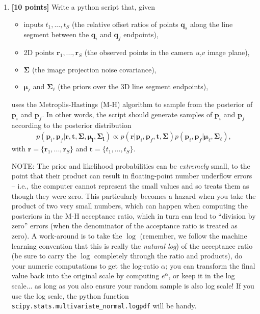 \documentclass[10pt]{article}
\begin{document}
\begin{enumerate}

\item {\bf [10 points]} Write a python script that, given
\begin{itemize}
\item inputs $t_1, ..., t_S$ (the relative offset ratios of points $\mathbf{q}_s$ along the line segment between the $\mathbf{q}_i$ and $\mathbf{q}_f$ endpoints),
\item 2D points $\mathbf{r}_1, ..., \mathbf{r}_S$ (the observed points in the camera $u$,$v$ image plane),
\item $\boldsymbol{\Sigma}$ (the image projection noise covariance),
\item $\boldsymbol{\mu}_{\boldsymbol{\ell}}$ and $\boldsymbol{\Sigma}_{\boldsymbol{\ell}}$ (the priors over the 3D line segment endpoints),
\end{itemize}
uses the Metroplis-Hastings (M-H) algorithm to sample from the posterior of $\mathbf{p}_i$ and $\mathbf{p}_f$.  In other words, the script should generate samples of $\mathbf{p}_i$ and $\mathbf{p}_f$ according to the posterior distribution
\begin{eqnarray*}
p(\mathbf{p}_i, \mathbf{p}_f | \mathbf{r}, \mathbf{t}, \boldsymbol{\Sigma}, \boldsymbol{\mu}_\mathbf{l}, \boldsymbol{\Sigma}_\mathbf{l}) 
\propto 
p(\mathbf{r} | \mathbf{p}_i, \mathbf{p}_f, \mathbf{t}, \boldsymbol{\Sigma})
p(\mathbf{p}_i, \mathbf{p}_f | \boldsymbol{\mu}_\mathbf{\ell}, \boldsymbol{\Sigma}_\mathbf{\ell}),
\end{eqnarray*}
with $\mathbf{r} = \{\mathbf{r}_1, ..., \mathbf{r}_S \}$ and $\mathbf{t} = \{t_1, ..., t_S \}$.

NOTE: The prior and likelihood probabilities can be {\em extremely} small, to the point that their product can result in floating-point number underflow errors -- i.e., the computer cannot represent the small values and so treats them as though they were zero. This particularly becomes a hazard when you take the product of two very small numbers, which can happen when computing the posteriors in the M-H acceptance ratio, which in turn can lead to ``division by zero'' errors (when the denominator of the acceptance ratio is treated as zero).  A work-around is to take the $\log$ (remember, we follow the machine learning convention that this is really the {\em natural log}) of the acceptance ratio (be sure to carry the $\log$ completely through the ratio and products), do your numeric computations to get the log-ratio $\alpha$; you can transform the final value back into the original scale by computing $e^{\alpha}$, or keep it in the log scale... as long as you also ensure your random sample is also log scale!  If you use the log scale, the python function {\tt scipy.stats.multivariate\_normal.logpdf} will be handy.


\end{enumerate}
\end{document}

